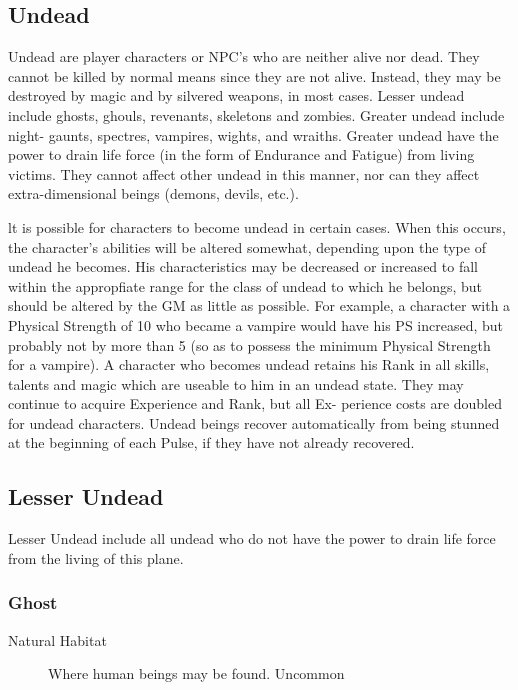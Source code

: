 \begin{multicols}{2}

\setlength\columnseprule{0.2mm}

\section{Undead}
Undead are player characters or NPC's who are neither alive nor
dead. They cannot be killed by normal means since they are not
alive. Instead, they may be destroyed by magic and by silvered
weapons, in most cases.  Lesser undead include ghosts, ghouls,
revenants, skeletons and zombies.  Greater undead include night-
gaunts, spectres, vampires, wights, and wraiths.  Greater undead have
the power to drain life force (in the form of Endurance and Fatigue)
from living victims.  They cannot affect other undead in this manner,
nor can they affect extra-dimensional beings (demons, devils, etc.).

lt is possible for characters to become undead in certain cases.  When
this occurs, the character's abilities will be altered somewhat,
depending upon the type of undead he becomes.  His characteristics may
be decreased or increased to fall within the appropfiate range for the
class of undead to which he belongs, but should be altered by the GM
as little as possible.  For example, a character with a Physical
Strength of 10 who became a vampire would have his PS increased, but
probably not by more than 5 (so as to possess the minimum Physical
Strength for a vampire).  A character who becomes undead retains his
Rank in all skills, talents and magic which are useable to him in an
undead state.  They may continue to acquire Experience and Rank, but
all Ex- perience costs are doubled for undead characters.  Undead
beings recover automatically from being stunned at the beginning of
each Pulse, if they have not already recovered.

\subsection{Lesser Undead}
Lesser Undead include all undead who do not have the power to drain
life force from the living of this plane.

\subsubsection{Ghost}

\begin{description}
\item[Natural Habitat] Where human beings may be found. Uncommon


\end{description}
\end{multicols}

